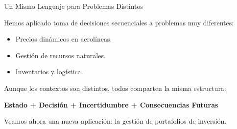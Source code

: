 \documentclass[xcolor=dvipsnames]{beamer}
\begin{document}

\begin{frame}{Un Mismo Lenguaje para Problemas Distintos}

Hemos aplicado toma de decisiones secuenciales a problemas muy diferentes:

\begin{itemize}
\item Precios dinámicos en aerolíneas.
\item Gestión de recursos naturales.
\item Inventarios y logística.
\end{itemize}

\vspace{0.3cm}

Aunque los contextos son distintos, todos comparten la misma estructura:

\begin{center}
\textbf{Estado + Decisión + Incertidumbre + Consecuencias Futuras}
\end{center}

\vspace{0.3cm}

Veamos ahora una nueva aplicación: la gestión de portafolios de inversión.

\end{frame}
\end{document}
